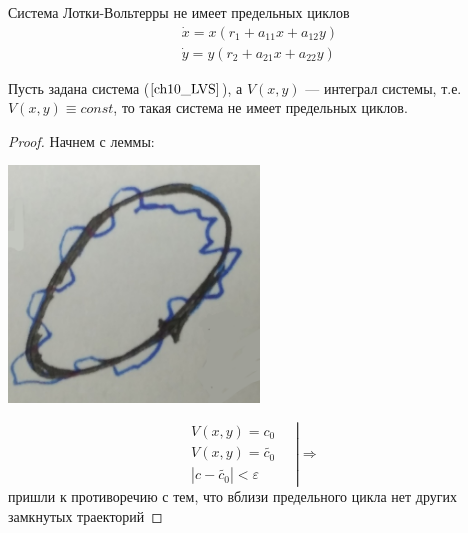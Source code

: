 	\begin{theorem}
		Система Лотки-Вольтерры не имеет предельных циклов
		\begin{equation}
			\begin{gathered}
				\dot{x} = x(r_1+a_{11}x+a_{12}y) \\
				\dot{y} = y(r_2+a_{21}x+a_{22}y)
			\end{gathered}	\label{ch10_LVS}
		\end{equation}
	\end{theorem}
	\begin{lemma}
			Пусть задана система ($\ref{ch10_LVS}$), а $V(x,y)$ --- интеграл системы, 
			т.е. \newline $V(x,y) \equiv const$, то такая система не имеет предельных циклов. 
	\end{lemma} 
	\begin{proof}{ Начнем с леммы:} \vspace{3mm}
	
		\begin{minipage}{0.3\textwidth}
			\begin{center} \includegraphics[width=0.5\textwidth]{ch8/pict/pict_5.png} \end{center} 
		\end{minipage}
		\begin{minipage}{0.58\textwidth}
			$$\left.
				\begin{gathered}
					V(x,y) = c_0 \\
					V(x,y) = \tilde{c_0} \\
					|c-\tilde{c_0}| < \varepsilon
				\end{gathered} \quad \right|\Rightarrow \quad 
			$$ пришли к противоречию с тем, что вблизи предельного цикла нет других замкнутых траекторий
		\end{minipage}		
		
	\end{proof}
